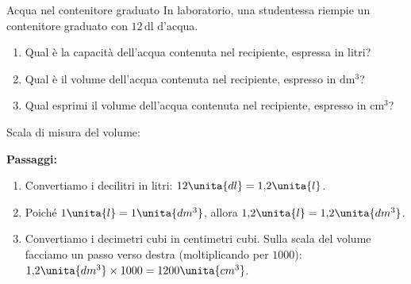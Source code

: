 

\begin{esercizio}{Acqua nel contenitore graduato}
In laboratorio, una studentessa riempie un contenitore graduato con $12\,\mathrm{dl}$ d'acqua.

\begin{enumerate}[label=\alph*)]
  \item Qual è la capacità dell'acqua contenuta nel recipiente, espressa in litri?
  \item Qual è il volume dell'acqua contenuta nel recipiente, espresso in $\mathrm{dm^3}$?
  \item Qual esprimi il volume dell'acqua contenuta nel recipiente, espresso in $\mathrm{cm^3}$?
\end{enumerate}

Scala di misura del volume: 

\responsespace{6.4cm}

\begin{soluzione}
  \textbf{Passaggi:}
  \begin{enumerate}[label=\alph*)]
    \item Convertiamo i decilitri in litri: $12\unita{dl} = 1{,}2\unita{l}$.
    \item Poiché $1\unita{l} = 1\unita{dm^3}$, allora $1{,}2\unita{l} = 1{,}2\unita{dm^3}$.
    \item Convertiamo i decimetri cubi in centimetri cubi. Sulla scala del volume facciamo un passo verso destra (moltiplicando per $1000$): $1{,}2\unita{dm^3} \times 1000 = 1200\unita{cm^3}$.
  \end{enumerate}
\end{soluzione}
\end{esercizio}

\condnewpage

